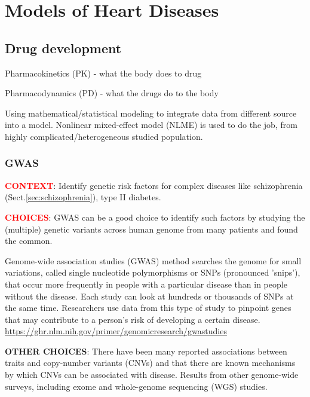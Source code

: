 
\chapter{Models of Heart Diseases}
\label{chap:models-heart-dise}

\section{Drug development}

Pharmacokinetics (PK)	 - what the body does to drug

Pharmacodynamics (PD) 	- what the drugs do to the body

Using mathematical/statistical modeling to integrate data from different source
into a model. Nonlinear mixed-effect model (NLME) is used to do the job, from
highly complicated/heterogeneous studied population. 


\subsection{GWAS}
\label{sec:GWAS}

\textcolor{red}{\bf CONTEXT}: Identify genetic risk factors for complex diseases
like schizophrenia (Sect.\ref{sec:schizophrenia}), type II diabetes.

\textcolor{red}{\bf CHOICES}: GWAS can be a good choice to identify such factors
by studying the (multiple) genetic variants across human genome from many
patients and found the common.

Genome-wide association studies (GWAS) method searches the genome for small
variations, called single nucleotide polymorphisms or SNPs (pronounced 'snips'),
that occur more frequently in people with a particular disease than in people
without the disease. Each study can look at hundreds or thousands of SNPs at the
same time. Researchers use data from this type of study to pinpoint genes that
may contribute to a person's risk of developing a certain disease. 
\url{https://ghr.nlm.nih.gov/primer/genomicresearch/gwastudies}

\begin{mdframed}

{\bf OTHER CHOICES}:
There have been many reported associations between traits and copy-number
variants (CNVs) and that there are known mechanisms by which CNVs can be
associated with disease. Results from other genome-wide surveys, including
exome and whole-genome sequencing (WGS) studies.

\end{mdframed}



